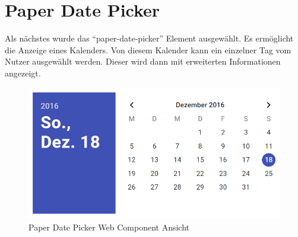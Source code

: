 \documentclass[12pt, paper=a4, bibtotoc, toc=listof, headsepline=true]{scrreprt}
\begin{document}
	\section{Paper Date Picker}
	Als nächstes wurde das \enquote{paper-date-picker} Element ausgewählt.\cite{datPic} Es ermöglicht die Anzeige eines Kalenders. Von diesem Kalender kann ein einzelner Tag vom Nutzer ausgewählt werden. Dieser wird dann mit erweiterten Informationen angezeigt.
		\begin{figure}[H]		
			\centering
			\includegraphics[width=\textwidth,height=\textheight,keepaspectratio]{datPic.png}
			\caption[Paper Date Picker]{Paper Date Picker Web Component Ansicht}
			\label{img:datPic}
		\end{figure}
\end{document}
